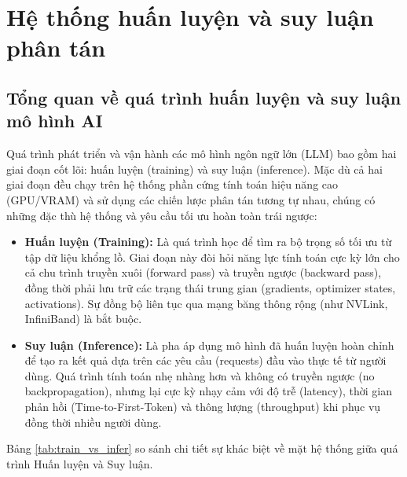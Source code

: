 \section{Hệ thống huấn luyện và suy luận phân tán}

\subsection{Tổng quan về quá trình huấn luyện và suy luận mô hình AI}
Quá trình phát triển và vận hành các mô hình ngôn ngữ lớn (LLM) bao gồm hai giai đoạn cốt lõi: huấn luyện (training) và suy luận (inference). Mặc dù cả hai giai đoạn đều chạy trên hệ thống phần cứng tính toán hiệu năng cao (GPU/VRAM) và sử dụng các chiến lược phân tán tương tự nhau, chúng có những đặc thù hệ thống và yêu cầu tối ưu hoàn toàn trái ngược:
\begin{itemize}
    \item \textbf{Huấn luyện (Training):} Là quá trình học để tìm ra bộ trọng số tối ưu từ tập dữ liệu khổng lồ. Giai đoạn này đòi hỏi năng lực tính toán cực kỳ lớn cho cả chu trình truyền xuôi (forward pass) và truyền ngược (backward pass), đồng thời phải lưu trữ các trạng thái trung gian (gradients, optimizer states, activations). Sự đồng bộ liên tục qua mạng băng thông rộng (như NVLink, InfiniBand) là bắt buộc.
    \item \textbf{Suy luận (Inference):} Là pha áp dụng mô hình đã huấn luyện hoàn chỉnh để tạo ra kết quả dựa trên các yêu cầu (requests) đầu vào thực tế từ người dùng. Quá trình tính toán nhẹ nhàng hơn và không có truyền ngược (no backpropagation), nhưng lại cực kỳ nhạy cảm với độ trễ (latency), thời gian phản hồi (Time-to-First-Token) và thông lượng (throughput) khi phục vụ đồng thời nhiều người dùng.
\end{itemize}

Bảng \ref{tab:train_vs_infer} so sánh chi tiết sự khác biệt về mặt hệ thống giữa quá trình Huấn luyện và Suy luận.

